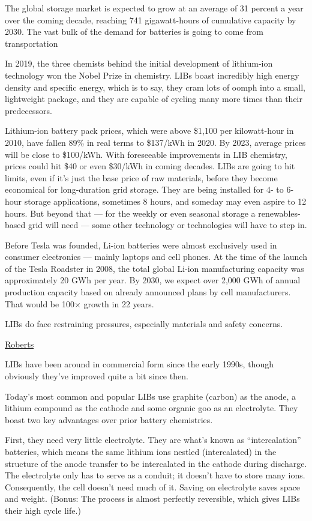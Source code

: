 \documentclass[
]{book}
\begin{document}
The global storage market is expected to grow at an average of 31 percent a year over the coming decade, reaching 741 gigawatt-hours of cumulative capacity by 2030.
The vast bulk of the demand for batteries is going to come from transportation

In 2019, the three chemists behind the initial development of lithium-ion technology won the Nobel Prize in chemistry. LIBs boast incredibly high energy density and specific energy, which is to say, they cram lots of oomph into a small, lightweight package, and they are capable of cycling many more times than their predecessors.

Lithium-ion battery pack prices, which were above \$1,100 per kilowatt-hour in 2010, have fallen 89\% in real terms to \$137/kWh in 2020. By 2023, average prices will be close to \$100/kWh.
With foreseeable improvements in LIB chemistry, prices could hit \$40 or even \$30/kWh in coming decades.
LIBs are going to hit limits, even if it's just the base price of raw materials, before they become economical for long-duration grid storage. They are being installed for 4- to 6-hour storage applications, sometimes 8 hours, and someday may even aspire to 12 hours. But beyond that --- for the weekly or even seasonal storage a renewables-based grid will need --- some other technology or technologies will have to step in.

Before Tesla was founded, Li-ion batteries were almost exclusively used in consumer electronics --- mainly laptops and cell phones. At the time of the launch of the Tesla Roadster in 2008, the total global Li-ion manufacturing capacity was approximately 20 GWh per year. By 2030, we expect over 2,000 GWh of annual production capacity based on already announced plans by cell manufacturers.
That would be 100× growth in 22 years.

LIBs do face restraining pressures, especially materials and safety concerns.

\href{https://www.canarymedia.com/articles/why-lithium-ion-batteries-are-so-important/}{Roberts}

LIBs have been around in commercial form since the early 1990s, though obviously they've improved quite a bit since then.

Today's most common and popular LIBs use graphite (carbon) as the anode, a lithium compound as the cathode and some organic goo as an electrolyte. They boast two key advantages over prior battery chemistries.

First, they need very little electrolyte. They are what's known as ``intercalation'' batteries, which means the same lithium ions nestled (intercalated) in the structure of the anode transfer to be intercalated in the cathode during discharge. The electrolyte only has to serve as a conduit; it doesn't have to store many ions. Consequently, the cell doesn't need much of it. Saving on electrolyte saves space and weight. (Bonus: The process is almost perfectly reversible, which gives LIBs their high cycle life.)
\end{document}

